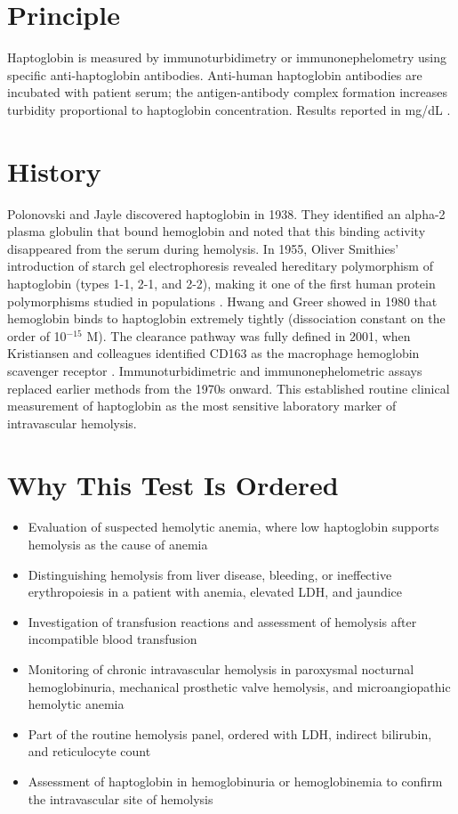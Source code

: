 \section*{Principle}
Haptoglobin is measured by immunoturbidimetry or immunonephelometry using specific anti-haptoglobin antibodies. Anti-human haptoglobin antibodies are incubated with patient serum; the antigen-antibody complex formation increases turbidity proportional to haptoglobin concentration. Results reported in mg/dL \cite{rifai2018tietz}.
\section*{History}
Polonovski and Jayle discovered haptoglobin in 1938. They identified an alpha-2 plasma globulin that bound hemoglobin and noted that this binding activity disappeared from the serum during hemolysis. In 1955, Oliver Smithies' introduction of starch gel electrophoresis revealed hereditary polymorphism of haptoglobin (types 1-1, 2-1, and 2-2), making it one of the first human protein polymorphisms studied in populations \cite{smithies1955zone}. Hwang and Greer showed in 1980 that hemoglobin binds to haptoglobin extremely tightly (dissociation constant on the order of 10$^{-15}$ M). The clearance pathway was fully defined in 2001, when Kristiansen and colleagues identified CD163 as the macrophage hemoglobin scavenger receptor \cite{kristiansen2001identification}. Immunoturbidimetric and immunonephelometric assays replaced earlier methods from the 1970s onward. This established routine clinical measurement of haptoglobin as the most sensitive laboratory marker of intravascular hemolysis.
\section*{Why This Test Is Ordered}
\begin{itemize}
  \item Evaluation of suspected hemolytic anemia, where low haptoglobin supports hemolysis as the cause of anemia
  \item Distinguishing hemolysis from liver disease, bleeding, or ineffective erythropoiesis in a patient with anemia, elevated LDH, and jaundice
  \item Investigation of transfusion reactions and assessment of hemolysis after incompatible blood transfusion
  \item Monitoring of chronic intravascular hemolysis in paroxysmal nocturnal hemoglobinuria, mechanical prosthetic valve hemolysis, and microangiopathic hemolytic anemia
  \item Part of the routine hemolysis panel, ordered with LDH, indirect bilirubin, and reticulocyte count
  \item Assessment of haptoglobin in hemoglobinuria or hemoglobinemia to confirm the intravascular site of hemolysis
\end{itemize}
